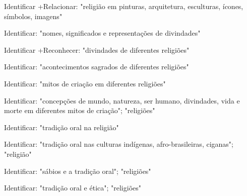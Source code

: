  Identificar +Relacionar: "religião em pinturas, arquitetura, esculturas, ícones, símbolos, imagens"

 Identificar: "nomes, significados e representações de divindades"

 Identificar +Reconhecer: "divindades de diferentes religiões"

 Identificar: "acontecimentos sagrados de diferentes religiões"

 Identificar: "mitos de criação em diferentes religiões"

 Identificar: "concepções de mundo, natureza, ser humano, divindades, vida e morte em diferentes mitos de criação"; "religiões"

 Identificar: "tradição oral na religião"

 Identificar: "tradição oral nas culturas indígenas, afro-brasileiras, ciganas"; "religião"

 Identificar: "sábios e a tradição oral"; "religiões"

 Identificar: "tradição oral e ética"; "religiões"
